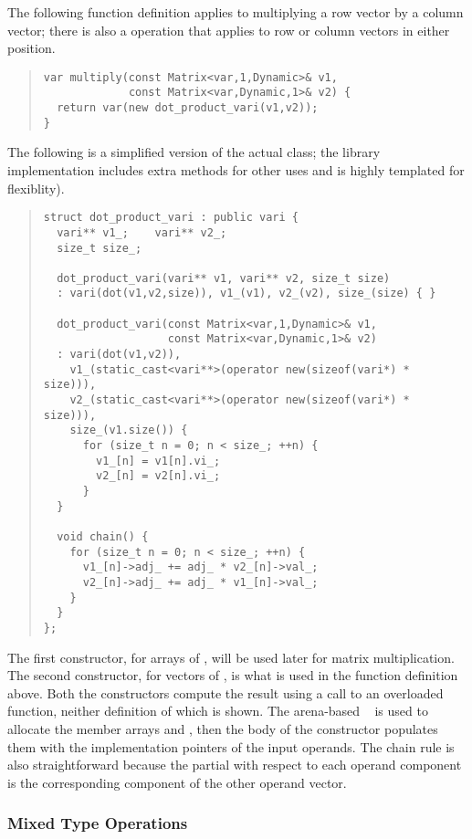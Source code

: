 \documentclass[10pt]{article}
\begin{document}
The following function definition applies to multiplying a row vector
by a column vector;  there is also a  operation
that applies to row or column vectors in either position.
%
\begin{quote}
\begin{Verbatim}
var multiply(const Matrix<var,1,Dynamic>& v1,
             const Matrix<var,Dynamic,1>& v2) {
  return var(new dot_product_vari(v1,v2));
}
\end{Verbatim}
\end{quote}
%
The following is a simplified version of the actual
 class; the library implementation includes
extra methods for other uses and is highly templated for flexiblity).
%
\begin{quote}
\begin{Verbatim}
struct dot_product_vari : public vari {
  vari** v1_;    vari** v2_;
  size_t size_;
  
  dot_product_vari(vari** v1, vari** v2, size_t size) 
  : vari(dot(v1,v2,size)), v1_(v1), v2_(v2), size_(size) { }

  dot_product_vari(const Matrix<var,1,Dynamic>& v1,
                   const Matrix<var,Dynamic,1>& v2)
  : vari(dot(v1,v2)),
    v1_(static_cast<vari**>(operator new(sizeof(vari*) * size))),
    v2_(static_cast<vari**>(operator new(sizeof(vari*) * size))),
    size_(v1.size()) {
      for (size_t n = 0; n < size_; ++n) {
        v1_[n] = v1[n].vi_;  
        v2_[n] = v2[n].vi_;
      }
  }

  void chain() {
    for (size_t n = 0; n < size_; ++n) {
      v1_[n]->adj_ += adj_ * v2_[n]->val_;
      v2_[n]->adj_ += adj_ * v1_[n]->val_;
    }
  }
};
\end{Verbatim}
\end{quote}
%
The first constructor, for arrays of , will be used later
for matrix multiplication.  The second constructor, for vectors of
, is what is used in the function definition above.  Both
the constructors compute the result using a call to an overloaded
function, neither definition of which is shown.  The arena-based
~ is used to allocate the member arrays
 and , then the body of the constructor
populates them with the implementation pointers of the input operands.
The chain rule is also straightforward because the partial with
respect to each operand component is the corresponding component of
the other operand vector.

\subsubsection{Mixed Type Operations}
\end{document}
